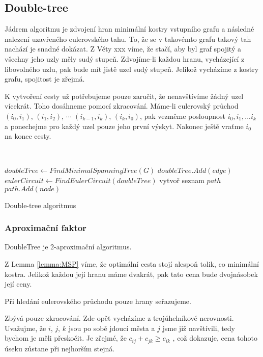 \documentclass[
  biblatex,
  figures=false,
  glossaries,
  index
]{kidiplom}
\begin{document}
\begin{example}
\end{example}

\subsection{Double-tree}
Jádrem algoritmu je zdvojení hran minimální kostry vstupního grafu a následné nalezení uzavřeného eulerovského tahu. To, že se v takovémto grafu takový tah nachází je snadné dokázat. Z Věty xxx víme, že stačí, aby byl graf spojitý a všechny jeho uzly měly sudý stupeň. Zdvojíme-li každou hranu, vycházející z libovolného uzlu, pak bude mít jistě uzel sudý stupeň. Jelikož vycházíme z kostry grafu, spojitost je zřejmá.

K vytvoření cesty už potřebujeme pouze zaručit, že nenavštívíme žádný uzel vícekrát. Toho dosáhneme pomocí zkracování. Máme-li eulerovský průchod $(i_0, i_1)$, $(i_1, i_2)$, $\cdots$ $(i_{k-1}, i_k)$, $(i_k, i_0)$, pak vezměme posloupnost $i_0, i_1,... i_k$ a ponechejme pro každý uzel pouze jeho první výskyt. Nakonec ještě vraťme $i_0$ na konec cesty. \newline

{\SetAlgoNoLine\
\begin{algorithm}[H]
$doubleTree \leftarrow FindMinimalSpanningTree(G)$\;
{
	$doubleTree.Add(edge)$\;
}
$eulerCircuit \leftarrow FindEulerCircuit(doubleTree)$\;
vytvoř seznam $path$\;
{
	{
		$path.Add(node)$\;
	}
}
\caption{Double-tree algoritmus}
\end{algorithm}}\leavevmode\newline

\subsubsection{Aproximační faktor}
\begin{theorem}
DoubleTree je 2-aproximační algoritmus.
\end{theorem}
	Z Lemma \ref{lemma:MSP} víme, že optimální cesta stojí alespoň tolik, co minimální kostra. Jelikož každou její hranu máme dvakrát, pak tato cena bude dvojnásobek její ceny.
	
	Při hledání eulerovského průchodu pouze hrany seřazujeme.
	
	Zbývá pouze zkracování.  Zde opět vycházíme z trojúhelníkové nerovnosti. Uvažujme, že $i$, $j$, $k$ jsou po sobě jdoucí města a $j$ jsme již navštívili, tedy bychom je měli přeskočit. Je zřejmé, že $c_{ij} + c_{jk} \ge c_{ik}$ , což dokazuje, cena tohoto úseku zůstane při nejhorším stejná.
	
\end{document}

